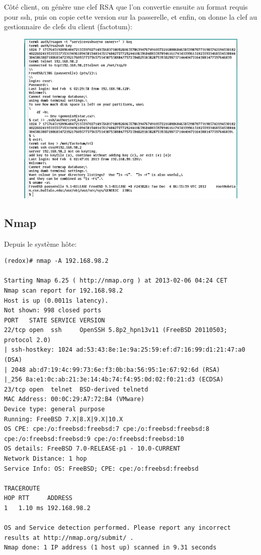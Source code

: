 \documentclass[a4paper]{article}
\begin{document}
Côté client, on génère une clef RSA que l'on convertie ensuite
au format requis pour ssh, puis on copie cette version sur la
passerelle, et enfin, on donne la clef au gestionnaire de clefs du
client (factotum):
\begin{figure}[!ht]
	\centering
	\includegraphics[scale=.5]{sshv1.png}
\end{figure}

\subsection{Nmap}
Depuis le système hôte:
\begin{verbatim}
(redox)# nmap -A 192.168.98.2

Starting Nmap 6.25 ( http://nmap.org ) at 2013-02-06 04:24 CET
Nmap scan report for 192.168.98.2
Host is up (0.0011s latency).
Not shown: 998 closed ports
PORT   STATE SERVICE VERSION
22/tcp open  ssh     OpenSSH 5.8p2_hpn13v11 (FreeBSD 20110503; protocol 2.0)
| ssh-hostkey: 1024 ad:53:43:8e:1e:9a:25:59:ef:d7:16:99:d1:21:47:a0 (DSA)
| 2048 ab:d7:19:4c:99:73:6e:f3:0b:ba:56:95:1e:67:92:6d (RSA)
|_256 8a:e1:0c:ab:21:3e:14:4b:74:f4:95:0d:02:f0:21:d3 (ECDSA)
23/tcp open  telnet  BSD-derived telnetd
MAC Address: 00:0C:29:A7:72:B4 (VMware)
Device type: general purpose
Running: FreeBSD 7.X|8.X|9.X|10.X
OS CPE: cpe:/o:freebsd:freebsd:7 cpe:/o:freebsd:freebsd:8 cpe:/o:freebsd:freebsd:9 cpe:/o:freebsd:freebsd:10
OS details: FreeBSD 7.0-RELEASE-p1 - 10.0-CURRENT
Network Distance: 1 hop
Service Info: OS: FreeBSD; CPE: cpe:/o:freebsd:freebsd

TRACEROUTE
HOP RTT     ADDRESS
1   1.10 ms 192.168.98.2

OS and Service detection performed. Please report any incorrect results at http://nmap.org/submit/ .
Nmap done: 1 IP address (1 host up) scanned in 9.31 seconds
\end{verbatim}
\end{document}
